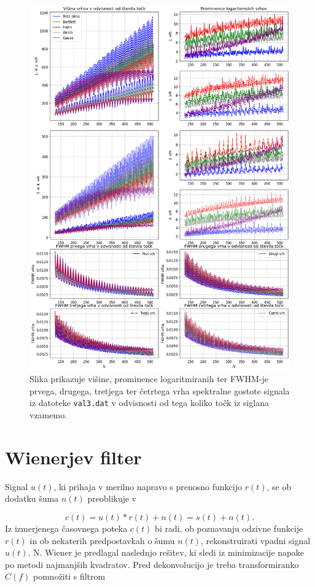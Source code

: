 \documentclass[slovene,11pt,a4paper]{article}
\begin{document}
\begin{figure}[h!]
\centering
\includegraphics[width=15cm]{slika10.png}
\caption{Slika prikazuje višine, prominence logaritmiranih ter FWHM-je prvega, drugega, tretjega ter četrtega vrha spektralne gostote signala iz datoteke \texttt{val3.dat} v odvisnosti od tega koliko točk iz siglana vzamemo.}
\end{figure}

\newpage

\section{Wienerjev filter}

Signal $u(t)$, ki prihaja v merilno napravo s prenosno funkcijo $r(t)$, se ob dodatku šuma $n(t)$ preoblikuje v 

\begin{equation}
c(t) = u(t) * r(t) + n(t) = s(t) + n(t).
\end{equation}
Iz izmerjenega časovnega poteka $c(t)$ bi radi, ob poznavanju odzivne funkcije $r(t)$ in ob nekaterih predpostavkah o šumu $n(t)$, rekonstruirati vpadni signal $u(t)$. N. Wiener je predlagal naslednjo rešitev, ki sledi iz minimizacije napake po metodi najmanjših kvadratov. Pred dekonvolucijo je treba transformiranko $C(f)$ pomnožiti s filtrom 
\end{document}
